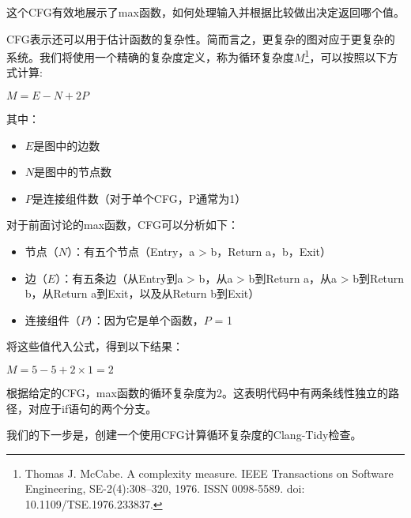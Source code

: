 这个CFG有效地展示了max函数，如何处理输入并根据比较做出决定返回哪个值。

CFG表示还可以用于估计函数的复杂性。简而言之，更复杂的图对应于更复杂的系统。我们将使用一个精确的复杂度定义，称为循环复杂度$M$\footnote{Thomas J. McCabe. A complexity measure. IEEE Transactions on Software Engineering, SE-2(4):308–320, 1976. ISSN 0098-5589. doi: 10.1109/TSE.1976.233837.}，可以按照以下方式计算:

$M = E - N + 2P$

其中：

\begin{itemize}
\item
$E$是图中的边数

\item
$N$是图中的节点数

\item
$P$是连接组件数（对于单个CFG，P通常为1）
\end{itemize}

对于前面讨论的max函数，CFG可以分析如下：

\begin{itemize}
\item
节点（$N$）：有五个节点（Entry，a > b，Return a，b，Exit）

\item
边（$E$）：有五条边（从Entry到a > b，从a > b到Return a，从a > b到Return b，从Return a到Exit，以及从Return b到Exit）

\item
连接组件（$P$）：因为它是单个函数，$P$ = 1
\end{itemize}

将这些值代入公式，得到以下结果：

$ M = 5 − 5 + 2 × 1 = 2$

根据给定的CFG，max函数的循环复杂度为2。这表明代码中有两条线性独立的路径，对应于if语句的两个分支。

我们的下一步是，创建一个使用CFG计算循环复杂度的Clang-Tidy检查。





































